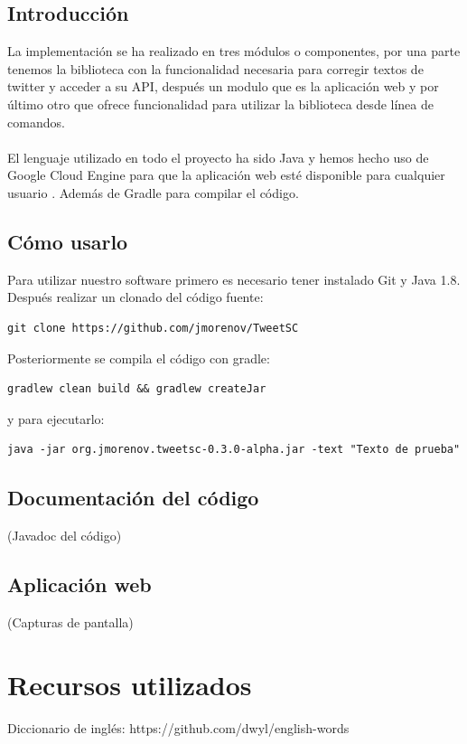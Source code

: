 \documentclass[spanish,12pt, a4paper,twoside]{paper}
\let\oldsection\section
\def\section{\cleardoublepage\oldsection}
\begin{document}
\subsection{Introducción}\label{sec:introduccion}
La implementación se ha realizado en tres módulos o componentes, por una parte tenemos la biblioteca con la funcionalidad necesaria para corregir textos de twitter y acceder a su API, después un modulo que es la aplicación web y por último otro que ofrece funcionalidad para utilizar la biblioteca desde línea de comandos.\\\\
El lenguaje utilizado en todo el proyecto ha sido Java y hemos hecho uso de Google Cloud Engine \cite{googlecloudengine} para que la aplicación web esté disponible para cualquier usuario \cite{tweetscweb:spellchecker}. Además de Gradle para compilar el código.
\subsection{Cómo usarlo}\label{sec:comousarlo}
Para utilizar nuestro software primero es necesario tener instalado Git y Java 1.8. Después realizar un clonado del código fuente: 
\begin{verbatim}
git clone https://github.com/jmorenov/TweetSC
\end{verbatim}
Posteriormente se compila el código con gradle: 
\begin{verbatim}
gradlew clean build && gradlew createJar
\end{verbatim}
y para ejecutarlo:
\begin{verbatim}
java -jar org.jmorenov.tweetsc-0.3.0-alpha.jar -text "Texto de prueba"
\end{verbatim}

\subsection{Documentación del código}\label{sec:javadoc}
(Javadoc del código)

\subsection{Aplicación web}\label{sec:aplicacionweb}
(Capturas de pantalla)

\section{Recursos utilizados}\label{sec:recursosutilizados}
Diccionario de inglés: https://github.com/dwyl/english-words
\end{document}
